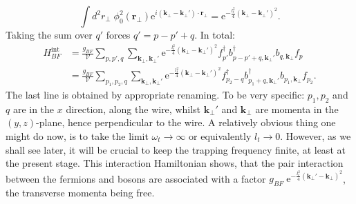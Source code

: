 \begin{equation}
\int d^2 r_\perp \; \phi^2_0(\mathbf{r}_{\perp})\text{e}^{i(\mathbf{k}_{\perp}-\mathbf{k}_{\perp}')\cdot \mathbf{r}_\perp} = \text{e}^{-\frac{l_t^2}{4}(\mathbf{k}_{\perp}-\mathbf{k}_{\perp}')^2}. \nonumber
\end{equation}
Taking the sum over $q'$ forces $q' = p-p' + q$. In total:
\begin{align}
H_{BF}^\text{int} &= \frac{g_{BF}}{\mathcal{V}}\sum_{p,p',q} \sum_{\mathbf{k}_\perp, \mathbf{k}_\perp'} \text{e}^{-\frac{l_t^2}{4}(\mathbf{k}_\perp-\mathbf{k}_\perp')^2} f^\dagger_{p'} b^\dagger_{p-p'+q, \mathbf{k}_\perp'} b_{q,\mathbf{k}_\perp}f_{p} \nonumber \\
                  &= \frac{g_{BF}}{\mathcal{V}}\sum_{p_1,p_2,q} \sum_{\mathbf{k}_\perp, \mathbf{k}_\perp'} \text{e}^{-\frac{l_t^2}{4}(\mathbf{k}_\perp-\mathbf{k}_\perp')^2} f_{p_2-q}^\dagger b_{p_1+q, \mathbf{k}_\perp'}^\dagger b_{p_1,\mathbf{k}_\perp}f_{p_2}.
\end{align}
The last line is obtained by appropriate renaming. To be very specific: $p_1,p_2$ and $q$ are in the $x$ direction, along the wire, whilst $\mathbf{k}_\perp'$ and $\mathbf{k}_\perp$ are momenta in the $(y,z)$-plane, hence perpendicular to the wire. A relatively obvious thing one might do now, is to take the limit $\omega_t \to \infty$ or equivalently $l_t \to 0$. However, as we shall see later, it will be crucial to keep the trapping frequency finite, at least at the present stage. This interaction Hamiltonian shows, that the pair interaction between the fermions and bosons are associated with a factor $g_{BF}\; \text{e}^{-\frac{l_t^2}{4}(\mathbf{k}_\perp'-\mathbf{k}_\perp)^2}$, the transverse momenta being free. 

